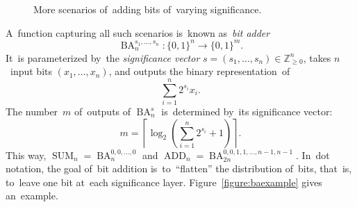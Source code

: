 \documentclass[a4paper, UKenglish, cleveref, autoref,  thm-restate, anonymous]{lipics-v2021}
\DeclareMathOperator{\SUM}{SUM}
\DeclareMathOperator{\ADD}{ADD}
\DeclareMathOperator{\BA}{BA}
\begin{document}
    \begin{figure}[ht]
        \begin{center}
        \end{center}
        \caption{More scenarios of~adding bits of~varying significance.}
        \label{figure:dot2}
    \end{figure}

    A~function capturing all such scenarios is~known as~\emph{bit adder}
    \[\BA_n^{s_1, \dotsc, s_n} \colon \{0,1\}^n \to \{0,1\}^m.\] It~is parameterized by~the \emph{significance vector}
    $s=(s_1, \dotsc, s_n) \in \mathbb{Z}_{\ge 0}^n$, takes $n$~input bits $(x_1, \dotsc, x_n)$, and outputs
    the binary representation~of
    \[\sum_{i=1}^{n}2^{s_i}x_i.\]
    The number~$m$ of~outputs of $\BA_n^s$ is~determined by~its significance vector:
    \[m=\left\lceil \log_2\left( \sum_{i=1}^{n}2^{s_i} + 1\right) \right\rceil.\]
    This way, $\SUM_n=\BA^{0,0,\dotsc,0}_n$ and $\ADD_n=\BA^{0,0,1,1,\dotsc,n-1,n-1}_{2n}$.
    In~dot notation, the goal of~bit addition is~to~``flatten''
    the distribution of~bits, that~is, to~leave one bit at~each significance layer.
    Figure~\ref{figure:baexample} gives an~example.
\end{document}
